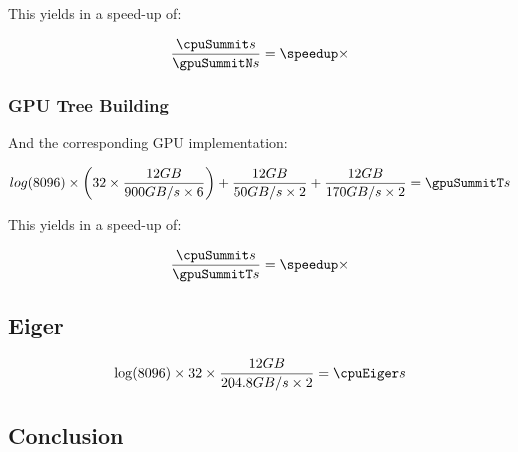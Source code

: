 \documentclass[]{article}
\begin{document}
This yields in a speed-up of:
\pgfmathsetmacro\speedup{\cpuSummit / \gpuSummitN}
\begin{center}
	\begin{equation}
		\frac{\cpuSummit s}{\gpuSummitN s} = \speedup \times 
	\end{equation}
\end{center}


\subsubsection{GPU Tree Building}

And the corresponding GPU implementation:
\pgfmathsetmacro{}
 
\begin{center}
	\begin{equation}
		log(\d) \times \left ( \p \times \frac{\s GB}{900 GB/s \times 6} \right ) + \frac{\s GB}{50 GB/s \times 2}  + \frac{\s GB}{170 GB/s \times 2} = \gpuSummitT s
	\end{equation}
\end{center}

This yields in a speed-up of:
\pgfmathsetmacro\speedup{\cpuSummit / \gpuSummitT}
\begin{center}
	\begin{equation}
		\frac{\cpuSummit s}{\gpuSummitT s} = \speedup \times
	\end{equation}
\end{center}


\vspace{5mm}


\subsection{Eiger}

\pgfmathsetmacro{}

\begin{center}
	\begin{equation}
		\log(\d) \times \p \times \frac{ \s GB }{204.8 GB/s \times 2} = \cpuEiger s
	\end{equation}
\end{center}

\subsection{Conclusion}
\end{document}
